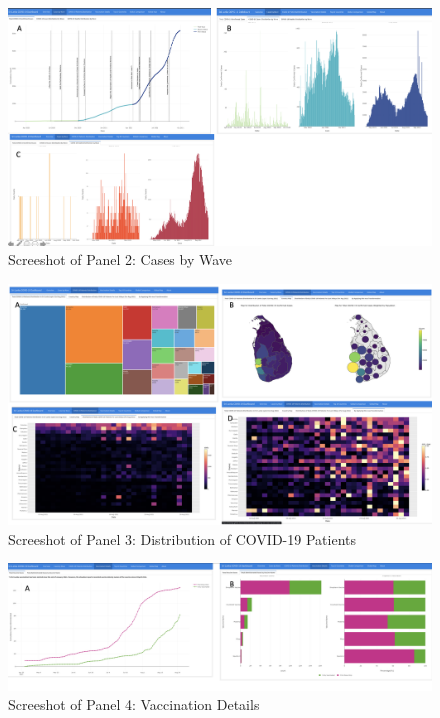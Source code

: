 \documentclass[
]{article}
\begin{document}
\begin{figure}

{\centering \includegraphics[width=0.8\linewidth]{Images/image2} 

}

\caption{Screeshot of Panel 2: Cases by Wave}\label{fig:unnamed-chunk-6}
\end{figure}

\begin{figure}

{\centering \includegraphics[width=0.8\linewidth]{Images/image3} 

}

\caption{Screeshot of Panel 3: Distribution of COVID-19 Patients}\label{fig:unnamed-chunk-7}
\end{figure}

\begin{figure}

{\centering \includegraphics[width=0.8\linewidth]{Images/image4} 

}

\caption{Screeshot of Panel 4: Vaccination Details}\label{fig:unnamed-chunk-8}
\end{figure}
\end{document}
